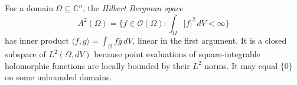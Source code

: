 
For a domain $\Omega\subseteq\mathbb C^n$, the \emph{Hilbert Bergman space}
\[
A^2(\Omega)=\{f\in\mathcal O(\Omega):\int_\Omega|f|^2\,dV<\infty\}
\]
has inner product $\langle f,g\rangle=\int_\Omega f\overline g\,dV$, linear in the first argument. It is a closed subspace of $L^2(\Omega,dV)$ because point evaluations of square-integrable holomorphic functions are locally bounded by their $L^2$ norms. It may equal $\{0\}$ on some unbounded domains.
